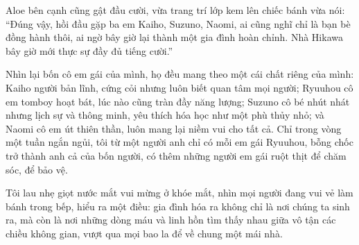 ﻿\documentclass[../main.tex]{subfiles}
\begin{document}
Aloe bên cạnh cũng gật đầu cười, vừa trang trí lớp kem lên chiếc bánh vừa nói: ``Đúng vậy, hồi đầu gặp ba em Kaiho, Suzuno, Naomi, ai cũng nghĩ chỉ là bạn bè đồng hành thôi, ai ngờ bây giờ lại thành một gia đình hoàn chỉnh. Nhà Hikawa bây giờ mới thực sự đầy đủ tiếng cười.''


Nhìn lại bốn cô em gái của mình, họ đều mang theo một cái chất riêng của mình: Kaiho người bản lĩnh, cứng cỏi nhưng luôn biết quan tâm mọi người; Ryuuhou cô em tomboy hoạt bát, lúc nào cũng tràn đầy năng lượng; Suzuno cô bé nhút nhát nhưng lịch sự và thông minh, yêu thích hóa học như một phù thủy nhỏ; và Naomi cô em út thiên thần, luôn mang lại niềm vui cho tất cả. Chỉ trong vòng một tuần ngắn ngủi, tôi từ một người anh chỉ có mỗi em gái Ryuuhou, bỗng chốc trở thành anh cả của bốn người, có thêm những người em gái ruột thịt để chăm sóc, để bảo vệ.

Tôi lau nhẹ giọt nước mắt vui mừng ở khóe mắt, nhìn mọi người đang vui vẻ làm bánh trong bếp, hiểu ra một điều: gia đình hóa ra không chỉ là nơi chúng ta sinh ra, mà còn là nơi những dòng máu và linh hồn tìm thấy nhau giữa vô tận các chiều không gian, vượt qua mọi bao la để về chung một mái nhà.
\end{document}
